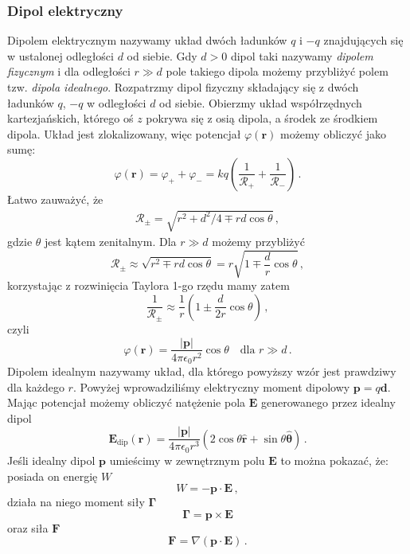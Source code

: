 \documentclass[../main.tex]{subfiles}
\begin{document}
\subsubsection{Dipol elektryczny}
Dipolem elektrycznym nazywamy układ dwóch ładunków \(q\) i \(-q\) znajdujących się w ustalonej
odległości \(d\) od siebie. Gdy \(d>0\) dipol taki nazywamy \textit{dipolem fizycznym} i dla
odległości \(r\gg d\) pole takiego dipola możemy przybliżyć polem tzw. \textit{dipola idealnego}.
Rozpatrzmy dipol fizyczny składający się z dwóch ładunków \(q\), \(-q\) w odległości \(d\) od
siebie. Obierzmy układ współrzędnych kartezjańskich, którego oś \(z\) pokrywa się z osią dipola, a
środek ze środkiem dipola. Układ jest zlokalizowany, więc potencjał \(\varphi(\mathbf{r})\) możemy
obliczyć jako sumę:
\begin{equation*}
    \varphi(\mathbf{r})=\varphi_++\varphi_-=kq\left(\frac{1}{\mathcal{R}_+}+\frac{1}{\mathcal{R}_-}\right)\,.
\end{equation*}
Łatwo zauważyć, że
\begin{equation*}
    \begin{split}
        \mathcal{R}_\pm=\sqrt{r^2+d^2/4\mp rd\cos\theta}\,,
    \end{split}
\end{equation*}
gdzie \(\theta\) jest kątem zenitalnym. Dla \(r\gg d\) możemy przybliżyć
\begin{equation*}
    \mathcal{R}_\pm\approx\sqrt{r^2\mp rd\cos\theta}=r\sqrt{1\mp\frac{d}{r}\cos\theta}\,,
\end{equation*}
korzystając z rozwinięcia Taylora 1-go rzędu mamy zatem
\begin{equation*}
    \frac{1}{\mathcal{R}_\pm}\approx \frac{1}{r}\left(1\pm\frac{d}{2r}\cos\theta\right)\,,
\end{equation*}
czyli
\begin{equation*}
    \varphi(\mathbf{r})=\frac{|\mathbf{p}|}{4\pi\epsilon_0r^2}\cos\theta\quad\text{dla \(r\gg d\)}\,.
\end{equation*}
Dipolem idealnym nazywamy układ, dla którego powyższy wzór jest prawdziwy dla każdego \(r\). Powyżej
wprowadziliśmy elektryczny moment dipolowy \(\mathbf{p}=q\mathbf{d}\). Mając potencjał możemy
obliczyć natężenie pola \(\mathbf{E}\) generowanego przez idealny dipol
\begin{equation*}
    \mathbf{E}_\text{dip}(\mathbf{r})=\frac{|\mathbf{p}|}{4\pi\epsilon_0r^3}(2\cos\theta\mathbf{\hat{r}}+\sin\theta\boldsymbol{\hat{\theta}})\,.
\end{equation*}
Jeśli idealny dipol \(\mathbf{p}\) umieścimy w zewnętrznym polu \(\mathbf{E}\) to można pokazać, że:
posiada on energię \(W\)
\begin{equation*}
    W=-\mathbf{p}\cdot\mathbf{E}\,,
\end{equation*}
działa na niego moment siły \(\boldsymbol{\Gamma}\)
\begin{equation*}
    \boldsymbol{\Gamma}=\mathbf{p}\times\mathbf{E}
\end{equation*}
oraz siła \(\mathbf{F}\)
\begin{equation*}
    \mathbf{F}=\nabla(\mathbf{p\cdot\mathbf{E}})\,.
\end{equation*}
\end{document}
